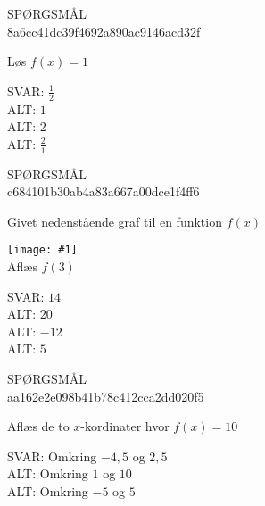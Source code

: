 \documentclass[]{article}
\newcounter{spgcounter}
\newenvironment{question}[2]{\addtocounter{spgcounter}{1} SPØRGSMÅL \thespgcounter\\}{\hspace{50px}}
\newcommand{\image}[1]{\texttt{[image: \#1]}\\}
\newcommand{\answer}[1]{{\color{green} SVAR: #1}\\}
\newcommand{\alt}[1]{{\color{red} ALT: #1}\\}
\begin{document}
\begin{question}{multi}\id{8a6cc41dc39f4692a890ac9146acd32f}
    
Løs $f(x)=1$
        
\answer{$\frac{1}{2}$}
\alt{$1$}
\alt{$2$}
\alt{$\frac{2}{1}$}

\end{question}


\begin{question}{multi}\id{c684101b30ab4a83a667a00dce1f4ff6}
    
Givet nedenstående graf til en funktion $f(x)$

\image{andengradsfunktionen1.png}

Aflæs $f(3)$

\answer{$14$}
\alt{$20$}
\alt{$-12$}
\alt{$5$}

\end{question}

\begin{question}{multi}\id{aa162e2e098b41b78c412cca2dd020f5}
    
Aflæs de to $x$-kordinater hvor $f(x)=10$
    
\answer{Omkring $-4,5$ og $2,5$}
\alt{Omkring $1$ og $10$}
\alt{Omkring $-5$ og $5$}

\end{question}
\end{document}
